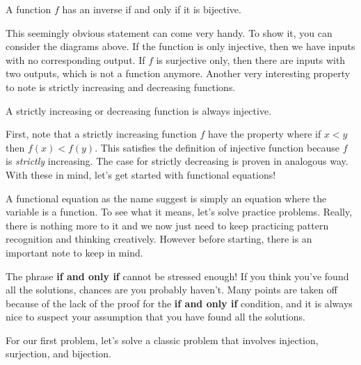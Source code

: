\documentclass[../../../main.tex]{subfiles}
\begin{document}
\begin{important}
A function $f$ has an inverse if and only if it is bijective.
\end{important}

This seemingly obvious statement can come very handy. To show it,
you can consider the diagrams above. If the function is only
injective, then we have inputs with no corresponding output.
If $f$ is surjective only, then there are inputs with two outputs,
which is not a function anymore. Another very interesting
property to note is strictly increasing and decreasing functions.

\begin{important}
A strictly increasing or decreasing function is always injective.
\end{important}

First, note that a strictly increasing function $f$ have the property
where if $x < y$ then $f(x) < f(y)$. This satisfies the definition
of injective function because $f$ is \textit{strictly} increasing.
The case for strictly decreasing is proven in analogous way.
With these in mind, let's get started with functional equations!

A functional equation as the name suggest is simply an equation
where the variable is a function. To see what it means, let's
solve practice problems. Really, there is nothing more to it
and we now just need to keep practicing pattern recognition and
thinking creatively. However before starting, there is an important
note to keep in mind.

\begin{important}
The phrase \textbf{if and only if} cannot be stressed enough!
If you think you've found all the solutions, chances are you
probably haven't. Many points are taken off because of the lack
of the proof for the \textbf{if and only if} condition, and it
is always nice to suspect your assumption that you have found all
the solutions.
\end{important}

For our first problem, let's solve a classic problem that involves
injection, surjection, and bijection.
\end{document}
